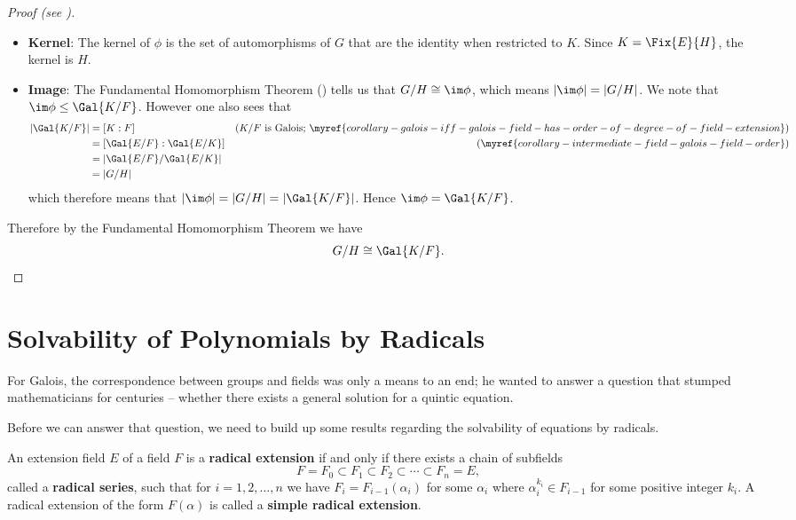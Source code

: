 \begin{proof}[Proof (see {\cite[Theorem 23.23, Statment 4]{judson_beezer_2022}})]
\begin{itemize}
        \item \textbf{Kernel}: The kernel of $\phi$ is the set of automorphisms of $G$ that are the identity when restricted to $K$. Since $K = \Fix{E}{H}$, the kernel is $H$.
        
        \item \textbf{Image}: The Fundamental Homomorphism Theorem () tells us that $G/H \cong \im\phi$, which means $|\im\phi| = |G/H|$. We note that $\im\phi \leq \Gal{K/F}$. However one also sees that
        \begin{align*}
            |\Gal{K/F}| &= [K:F] & (K/F \text{ is Galois; } \myref{corollary-galois-iff-galois-field-has-order-of-degree-of-field-extension})\\
            &= [\Gal{E/F}:\Gal{E/K}] & (\myref{corollary-intermediate-field-galois-field-order})\\
            &= |\Gal{E/F}/\Gal{E/K}|\\
            &= |G/H|
        \end{align*}
        which therefore means that $|\im\phi| = |G/H| = |\Gal{K/F}|$. Hence $\im\phi = \Gal{K/F}$.
    \end{itemize}
    Therefore by the Fundamental Homomorphism Theorem we have
    \[
        G/H \cong \Gal{K/F}.\qedhere
    \]
\end{proof}

\section{Solvability of Polynomials by Radicals}
For Galois, the correspondence between groups and fields was only a means to an end; he wanted to answer a question that stumped mathematicians for centuries -- whether there exists a general solution for a quintic equation.

Before we can answer that question, we need to build up some results regarding the solvability of equations by radicals.

\begin{definition}
    An extension field $E$ of a field $F$ is a \textbf{radical extension} if and only if there exists a chain of subfields
    \[
        F = F_0 \subset F_1 \subset F_2 \subset \cdots \subset F_n = E,
    \]
    called a \textbf{radical series}, such that for $i = 1, 2, \dots, n$ we have $F_i = F_{i-1}(\alpha_i)$ for some $\alpha_i$ where $\alpha_i^{k_i} \in F_{i-1}$ for some positive integer $k_i$. A radical extension of the form $F(\alpha)$ is called a \textbf{simple radical extension}.
\end{definition}

